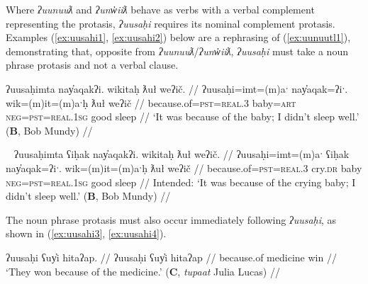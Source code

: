 
Where \textit{ʔuunuuƛ} and \textit{ʔunw̓iiƛ} behave as verbs with a verbal complement representing the protasis, \textit{ʔuusaḥi} requires its nominal complement protasis. Examples (\ref{ex:uusahi1}, \ref{ex:uusahi2}) below are a rephrasing of (\ref{ex:uunuutl1}), demonstrating that, opposite from \textit{ʔuunuuƛ}/\textit{ʔunw̓iiƛ}, \textit{ʔuusaḥi} must take a noun phrase protasis and not a verbal clause. 

\ex \label{ex:uusahi1}
\begingl
\glpreamble ʔuusaḥimta nay̓aqakʔi. wikitaḥ ƛuł weʔič. //
\gla ʔuusaḥi=imt=(m)aˑ nay̓aqak=ʔiˑ. wik=(m)it=(m)aˑḥ ƛuł weʔič //
\glb because.of=\textsc{pst}=\textsc{real.3} baby=\textsc{art} \textsc{neg}=\textsc{pst}=\textsc{real.1sg} good sleep //
\glft `It was because of the baby; I didn't sleep well.' (\textbf{B}, Bob Mundy) //
\endgl
\xe

\ex~ \label{ex:uusahi2}
\begingl
\glpreamble *ʔuusaḥimta ʕiḥak nay̓aqakʔi. wikitaḥ ƛuł weʔič. //
\gla ʔuusaḥi=imt=(m)aˑ ʕiḥak nay̓aqak=ʔiˑ. wik=(m)it=(m)aˑḥ ƛuł weʔič //
\glb because.of=\textsc{pst}=\textsc{real.3} cry.\textsc{dr} baby \textsc{neg}=\textsc{pst}=\textsc{real.1sg} good sleep //
\glft Intended: `It was because of the crying baby; I didn't sleep well.' (\textbf{B}, Bob Mundy) //
\endgl
\xe

The noun phrase protasis must also occur immediately following \textit{ʔuusaḥi}, as shown in (\ref{ex:uusahi3}, \ref{ex:uusahi4}).

\ex \label{ex:uusahi3}
\begingl
\glpreamble ʔuusaḥi ʕuy̓i hitaʔap. //
\gla ʔuusaḥi ʕuy̓i hitaʔap //
\glb because.of medicine win //
\glft `They won because of the medicine.' (\textbf{C}, \textit{tupaat} Julia Lucas) //
\endgl
\xe


